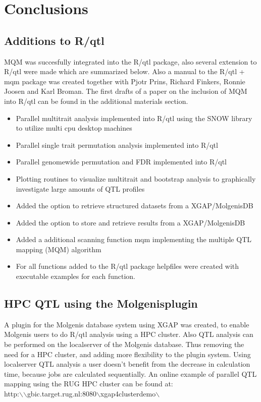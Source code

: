 \newpage
\section{Conclusions}
\subsection{Additions to R/qtl}
MQM was succesfully integrated into the R/qtl package, also several extension to R/qtl
were made which are summarized below. Also a manual to the R/qtl + mqm package was created together with Pjotr Prins, Richard Finkers, Ronnie Joosen and Karl Broman. The first drafts of a paper on the inclusion of MQM into R/qtl can be found in the additional materials section.
\begin{itemize}
\item Parallel multitrait analysis implemented into R/qtl using the SNOW library to utilize multi cpu desktop machines
\item Parallel single trait permutation analysis implemented into R/qtl
\item Parallel genomewide permutation and FDR implemented into R/qtl
\item Plotting routines to visualize multitrait and bootstrap analysis to graphically investigate large amounts of QTL profiles
\item Added the option to retrieve structured datasets from a XGAP/MolgenisDB
\item Added the option to store and retrieve results from a XGAP/MolgenisDB
\item Added a additional scanning function mqm implementing the multiple QTL mapping (MQM) algorithm
\item For all functions added to the R/qtl package helpfiles were created with executable examples for each function.
\end{itemize}
\subsection{HPC QTL using the Molgenisplugin}
A plugin for the Molgenis database system using XGAP was created, to enable Molgenis users to do R/qtl analysis using a HPC cluster.
Also QTL analysis can be performed on the localserver of the Molgenis database. Thus removing the need for a HPC cluster, and adding more flexibility to the plugin system. Using localserver QTL analysis a user doesn't benefit from the decrease in calculation time, because jobs are calculated sequentially. An online example of parallel QTL mapping using the RUG HPC cluster can be found at:\\
http:$\backslash$$\backslash$gbic.target.rug.nl:8080$\backslash$xgap4clusterdemo$\backslash$ \\
